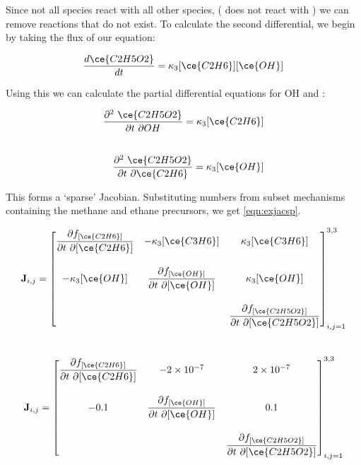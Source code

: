 Since not all species react with all other species, ( does not react with ) we can remove reactions that do not exist. To calculate the second differential, we begin by taking the flux of our equation:

\begin{equation}
    \frac{d\ce{C2H5O2}}{dt} = \kappa_3 [\ce{C2H6}][\ce{OH}]
\end{equation}

Using this we can calculate the partial differential equations for OH and :

\begin{eqnarray}
    \frac{\partial ^2 \ \ce{C2H5O2} }{\partial t \ \partial OH} = \kappa_3 [\ce{C2H6}] \\[20pt]
    \frac{\partial ^2 \ \ce{C2H5O2} }{\partial t \ \partial \ce{C2H6}} = \kappa_3 [\ce{OH}]
\end{eqnarray}


This forms a `sparse' Jacobian. Substituting numbers from subset mechanisms containing the methane and ethane precursors, we get \autoref{eqn:exjacsp}.





\begin{eqnarray}
 \mathbf{J}_{i,j} =
\begin{bmatrix}
\dfrac{\partial f_{[\ce{C2H6}]}}{\partial t \ \partial {[\ce{C2H6}]}} &
  - \kappa_3[\ce{C3H6}] &
  \kappa_3[\ce{C3H6}] \\[20pt]
-\kappa_3[\ce{OH}] &
  \dfrac{\partial f_{[\ce{OH}]}}{\partial t \ \partial {[\ce{OH}]}} &
\kappa_3[\ce{OH}] \\[20pt]
\  &
 \  &
  \dfrac{\partial f_{[\ce{C2H5O2}]}}{\partial t \ \partial {[\ce{C2H5O2}]}}
\end{bmatrix}_{i,j=1}^{3,3}
\label{eqn:exjacsppre}
\end{eqnarray}\\



   \begin{eqnarray}
    \mathbf{J}_{i,j} =
 \begin{bmatrix}
   \dfrac{\partial f_{[\ce{C2H6}]}}{\partial t \ \partial {[\ce{C2H6}]}} &
     - 2\times 10^{-7} &
     2\times 10^{-7} \\[20pt]
   -0.1 &
     \dfrac{\partial f_{[\ce{OH}]}}{\partial t \ \partial {[\ce{OH}]}} &
  0.1 \\[20pt]
   \  &
    \  &
     \dfrac{\partial f_{[\ce{C2H5O2}]}}{\partial t \ \partial {[\ce{C2H5O2}]}}
 \end{bmatrix}_{i,j=1}^{3,3}
 \label{eqn:exjacsp}
\end{eqnarray}\\

